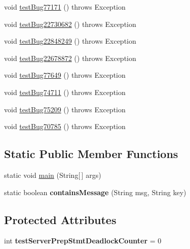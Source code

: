 \begin{DoxyCompactItemize}
\item 
void \mbox{\hyperlink{classtestsuite_1_1regression_1_1_connection_regression_test_adca05ee2426734f0d6b5bdf2c98ceeef}{test\+Bug77171}} ()  throws Exception 
\item 
void \mbox{\hyperlink{classtestsuite_1_1regression_1_1_connection_regression_test_a415dfcfbf9a9c7542bc8defe119ee97c}{test\+Bug22730682}} ()  throws Exception 
\item 
void \mbox{\hyperlink{classtestsuite_1_1regression_1_1_connection_regression_test_a9c80414050a22a9ebafdb247f107d6f2}{test\+Bug22848249}} ()  throws Exception 
\item 
void \mbox{\hyperlink{classtestsuite_1_1regression_1_1_connection_regression_test_a36543b7a9aa8ea81c2e039db4955494c}{test\+Bug22678872}} ()  throws Exception 
\item 
void \mbox{\hyperlink{classtestsuite_1_1regression_1_1_connection_regression_test_ad3b1937f8602e34bfceaeaf3229c9e68}{test\+Bug77649}} ()  throws Exception 
\item 
void \mbox{\hyperlink{classtestsuite_1_1regression_1_1_connection_regression_test_a9c03aad693cf9263c8523b7d3c65f223}{test\+Bug74711}} ()  throws Exception 
\item 
void \mbox{\hyperlink{classtestsuite_1_1regression_1_1_connection_regression_test_a0cc242ab6f5c5f0c1bb19d14d37bb866}{test\+Bug75209}} ()  throws Exception 
\item 
void \mbox{\hyperlink{classtestsuite_1_1regression_1_1_connection_regression_test_a2e9ffad8504db4b26677d74c5f5b0a65}{test\+Bug70785}} ()  throws Exception 
\end{DoxyCompactItemize}
\subsection*{Static Public Member Functions}
\begin{DoxyCompactItemize}
\item 
static void \mbox{\hyperlink{classtestsuite_1_1regression_1_1_connection_regression_test_a07f235ef52b2330590e2069478598e41}{main}} (String\mbox{[}$\,$\mbox{]} args)
\item 
\mbox{\label{classtestsuite_1_1regression_1_1_connection_regression_test_ac9b394063b52338bbdb0a9666b6aca23}} 
static boolean {\bfseries contains\+Message} (String msg, String key)
\end{DoxyCompactItemize}
\subsection*{Protected Attributes}
\begin{DoxyCompactItemize}
\item 
\mbox{\label{classtestsuite_1_1regression_1_1_connection_regression_test_abbdb58ac7596236d509c07f48d6dc396}} 
int {\bfseries test\+Server\+Prep\+Stmt\+Deadlock\+Counter} = 0
\end{DoxyCompactItemize}

